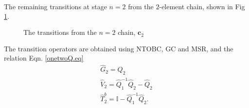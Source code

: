 \documentclass[11pt]{article}
\newcommand{\hQ}{\hat Q}
\newcommand*{\drawprobleft}[4][]{%
  \draw[prob arrow] (#2)-- node[above left, below, midway, #1] {$#3$} (#4);
}
\newcommand*{\drawprobrighttop}[4][]{%
  \draw[prob arrow] (#2)-- node[right=0.2,midway, #1] {$#3$} (#4);
}
\newcommand{\chain}{\mathbf c}
\newcommand{\id}{\mathbb I}
\newcommand{\h}{\hat}
\begin{document}
The remaining transitions at   stage $n=2$ from the $2$-element chain,
shown in Fig \ref{chaintwo.fig}.  
\begin{figure}[H]
 \centering
\caption{The transitions from the $n=2$ chain, $\chain_2$ } 
\label{chaintwo.fig} 
 \end{figure}
The transition operators  are obtained using NTOBC, GC and MSR,
and the relation Eqn. \eqref{onetwoQ.eq} 
\begin{eqnarray}
   \h G_2=Q_2 \nonumber \\ 
   \h V_2 = \hQ_1^{-1} \hQ_2 - \hQ_2 \nonumber \\
   \h T_2^b =\id - \hQ_1^{-1} \hQ_2.
\end{eqnarray}
 
\end{document}
